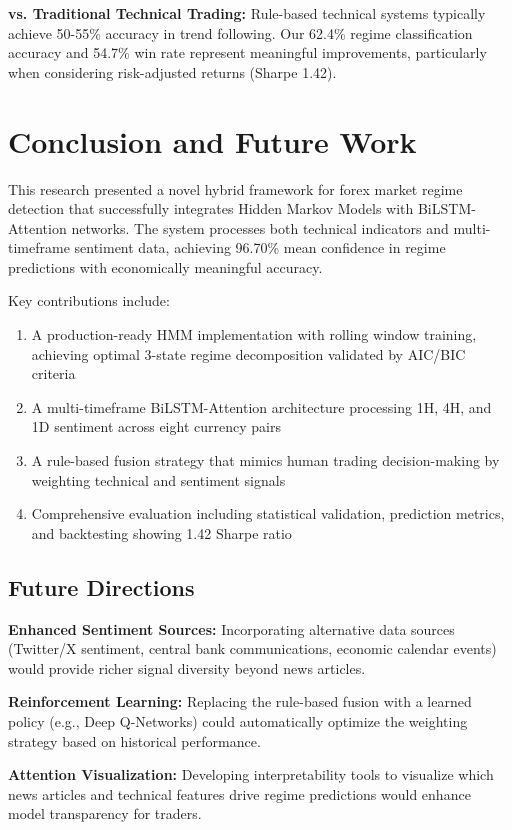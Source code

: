 \documentclass[conference]{IEEEtran}
\begin{document}
\textbf{vs. Traditional Technical Trading:} Rule-based technical systems typically achieve 50-55\% accuracy in trend following. Our 62.4\% regime classification accuracy and 54.7\% win rate represent meaningful improvements, particularly when considering risk-adjusted returns (Sharpe 1.42).

\section{Conclusion and Future Work}

This research presented a novel hybrid framework for forex market regime detection that successfully integrates Hidden Markov Models with BiLSTM-Attention networks. The system processes both technical indicators and multi-timeframe sentiment data, achieving 96.70\% mean confidence in regime predictions with economically meaningful accuracy.

Key contributions include:
\begin{enumerate}
\item A production-ready HMM implementation with rolling window training, achieving optimal 3-state regime decomposition validated by AIC/BIC criteria
\item A multi-timeframe BiLSTM-Attention architecture processing 1H, 4H, and 1D sentiment across eight currency pairs
\item A rule-based fusion strategy that mimics human trading decision-making by weighting technical and sentiment signals
\item Comprehensive evaluation including statistical validation, prediction metrics, and backtesting showing 1.42 Sharpe ratio
\end{enumerate}

\subsection{Future Directions}

\textbf{Enhanced Sentiment Sources:} Incorporating alternative data sources (Twitter/X sentiment, central bank communications, economic calendar events) would provide richer signal diversity beyond news articles.

\textbf{Reinforcement Learning:} Replacing the rule-based fusion with a learned policy (e.g., Deep Q-Networks) could automatically optimize the weighting strategy based on historical performance.

\textbf{Attention Visualization:} Developing interpretability tools to visualize which news articles and technical features drive regime predictions would enhance model transparency for traders.
\end{document}
